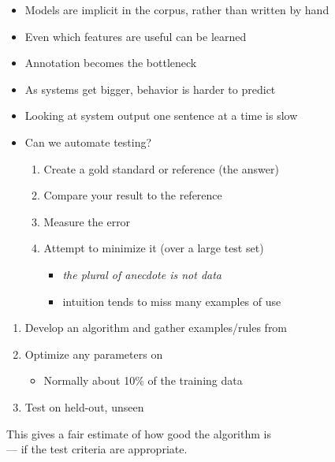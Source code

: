 \documentclass[a4paper,landscape,headrule,footrule,dvips]{foils}
\begin{document}
\begin{CJK}{UTF8}{min}
\begin{itemize}
\begin{itemize}
  \item Models are implicit in the corpus, rather than written by hand
  \item Even which features are useful can be learned
  \item Annotation becomes the bottleneck
  \end{itemize}
\end{itemize}

\MyLogo{}
\begin{itemize}
\item As systems get bigger, behavior is harder to predict
\item Looking at system output one sentence at a time is slow

\item Can we automate testing?
  \begin{enumerate}
  \item Create a gold standard or reference (the  answer)
  \item Compare your result to the reference
  \item Measure the error
  \item Attempt to minimize it  (over a large test set)
    \begin{itemize}
    \item \textit{the plural of anecdote is not data}
    \item intuition tends to miss many examples of use
    \end{itemize}
  \end{enumerate} 

\end{itemize}


\begin{enumerate}
\item Develop an algorithm and gather examples/rules from 
\item Optimize any parameters on 
  \begin{itemize}
  \item Normally about 10\% of the training data
  \end{itemize}
\item Test on held-out, unseen 
\end{enumerate}

This gives a fair estimate of how good the algorithm is 
\\ --- if the test criteria are appropriate.



\end{CJK}
\end{document}
